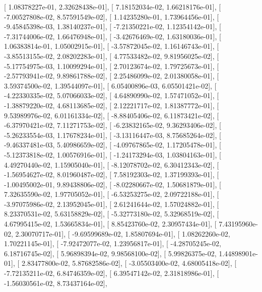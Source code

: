 \documentclass{article}
\begin{document}
       [  1.08378227e-01,   2.32628438e-01],
       [  7.18152034e-02,   1.66218176e-01],
       [ -7.00527808e-02,   8.57591549e-02],
       [  1.14235280e-01,   1.73964456e-01],
       [ -9.45845398e-03,   1.38140237e-01],
       [ -7.21350221e-02,   1.12354142e-01],
       [ -7.31744006e-02,   1.66476948e-01],
       [ -3.42676469e-02,   1.63180036e-01],
       [  1.06383814e-01,   1.05002915e-01],
       [ -3.57872045e-02,   1.16146743e-01],
       [ -3.85513155e-02,   2.08202283e-01],
       [  4.77533482e-02,   9.81956025e-02],
       [ -5.17754975e-03,   1.10099294e-01],
       [  2.70123674e-02,   1.79725673e-01],
       [ -2.57793941e-02,   9.89861788e-02],
       [  2.25486099e-02,   2.01380058e-01],
       [  3.59374500e-02,   1.39544097e-01],
       [  6.05400896e-03,   6.05501421e-02],
       [ -4.22330335e-02,   5.07066033e-02],
       [  4.64890990e-02,   1.57471052e-01],
       [ -1.38879220e-02,   4.68113685e-02],
       [  2.12221717e-02,   1.81387772e-01],
       [  9.53989976e-02,   6.01161334e-02],
       [ -8.88405406e-02,   6.11873421e-02],
       [ -6.37970421e-02,   7.11271753e-02],
       [ -6.23832165e-02,   9.36293406e-02],
       [ -5.26233554e-03,   1.17678234e-01],
       [ -3.13116447e-03,   8.75685264e-02],
       [ -9.46337481e-03,   5.40986659e-02],
       [ -4.09767865e-02,   1.17205478e-01],
       [ -5.12373818e-02,   1.00576916e-01],
       [ -1.24173294e-03,   1.03804163e-01],
       [  4.49270440e-02,   1.15905040e-01],
       [ -8.12078702e-02,   6.30412343e-02],
       [ -1.56954627e-02,   8.01960487e-02],
       [  7.58192303e-02,   1.37199393e-01],
       [ -1.00495002e-01,   9.89438806e-02],
       [ -8.02280667e-02,   1.50681879e-01],
       [  7.32635590e-02,   1.97705052e-01],
       [ -6.53253275e-02,   2.09722188e-01],
       [ -3.97075986e-02,   2.13952045e-01],
       [  2.61241644e-02,   1.57024882e-01],
       [  8.23370531e-02,   5.63158829e-02],
       [ -5.32773180e-02,   5.32968519e-02],
       [  4.67995415e-02,   1.53665834e-01],
       [  8.85423760e-02,   2.30957434e-01],
       [  7.43195960e-02,   2.30070717e-01],
       [ -9.69599689e-02,   1.85807694e-01],
       [  1.08262260e-02,   1.70221145e-01],
       [ -7.92472077e-02,   1.23956817e-01],
       [ -4.28705245e-02,   6.18716745e-02],
       [  5.96898394e-02,   9.98568100e-02],
       [  5.99826375e-02,   1.44898901e-01],
       [  2.83477800e-02,   5.87682586e-02],
       [ -3.05503400e-02,   4.68005418e-02],
       [ -7.72135211e-02,   6.84746359e-02],
       [  6.39547142e-02,   2.31818986e-01],
       [ -1.56030561e-02,   8.73437164e-02],
\end{document}
